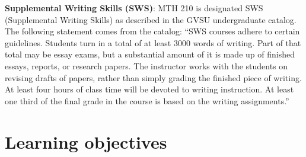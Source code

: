\documentclass[11pt]{article}
\begin{document}
\textbf{Supplemental Writing Skills (SWS)}: MTH 210 is designated SWS (Supplemental Writing Skills) as described in the GVSU undergraduate catalog. The following statement comes from the catalog: ``SWS courses adhere to certain guidelines. Students turn in a total of at least 3000 words of writing. Part of that total may be essay exams, but a substantial amount of it is made up of finished essays, reports, or research papers. The instructor works with the students on revising drafts of papers, rather than simply grading the finished piece of writing. At least four hours of class time will be devoted to writing instruction. At least one third of the final grade in the course is based on the writing assignments.''

\section*{Learning objectives}
\end{document}
